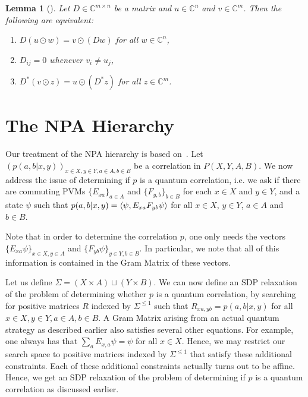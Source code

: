 \documentclass[11pt,a4paper]{article}
\theoremstyle{plain}
\newtheorem{lem}[thm]{Lemma}
\theoremstyle{remark}
\theoremstyle{definition}
\newcommand{\complex}{\mathbb{C}}
\begin{document}
\begin{lem}[{\cite[Lemma 4.5]{david_mathprog}}]
  \label{lem:linalg_parallel}
  Let $D\in\complex^{m\times n}$ be a matrix and $u\in\complex^n$ and $v \in \complex^{m}$.
  Then the following are equivalent:
  \begin{enumerate}
    \item $D(u\odot w) = v\odot(Dw)$ for all $w\in\complex^n$,
    \item $D_{ij} = 0$ whenever $v_i \neq u_j$,
    \item $D^*(v\odot z) = u\odot(D^*z)$ for all $z\in\complex^m$.
  \end{enumerate}
\end{lem}



\section{The NPA Hierarchy}\label{sec:npa}

Our treatment of the NPA hierarchy is based on~\cite[Chapter 8]{watrous_notes}.
Let $(p(a,b|x,y))_{x \in X, y \in Y, a \in A, b \in B}$ be a correlation in $P(X, Y, A, B)$. We now address the issue of determining if $p$ is a quantum correlation, i.e. we ask if there are commuting PVMs $\{E_{xa}\}_{a \in A}$ and $\{F_{y,b}\}_{b \in B}$ for each $x \in X$ and $y \in Y$, and a state $\psi$ such that $p(a,b|x,y) = \braket{ \psi, E_{xa} F_{yb} \psi}$ for all $x \in X$, $y \in Y$, $a \in A$ and $b \in B$. 

Note that in order to determine the correlation $p$, one only needs the vectors $\{E_{xa}\psi\}_{x\in X, y \in A}$ and $\{F_{yb}\psi\}_{y \in Y, b \in B}$. In particular, we note that all of this information is contained in the Gram Matrix of these vectors. 

Let us define $\Sigma = (X \times A) \sqcup (Y \times B)$. We can now define an SDP relaxation of the problem of determining whether $p$ is a quantum correlation, by searching for positive matrices $R$ indexed by $\Sigma^{\leq 1}$ such that $R_{xa, yb} = p(a,b|x,y)$ for all $x \in X, y \in Y, a \in A, b \in B$. A Gram Matrix arising from an actual quantum strategy as described earlier also satisfies several other equations. For example, one always has that $\sum_{a} E_{x,a}\psi = \psi$ for all $x \in X$. Hence, we may restrict our search space to positive matrices indexed by $\Sigma^{\leq 1}$ that satisfy these additional constraints. Each of these additional constraints actually turns out to be affine. Hence, we get an SDP relaxation of the problem of determining if $p$ is a quantum correlation as discussed earlier. 
\end{document}
